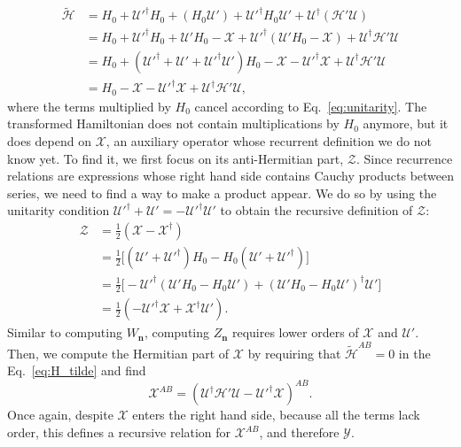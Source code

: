 \begin{equation}
\label{eq:H_tilde}
\begin{aligned}
  \tilde{\mathcal{H}}
  &= H_0 + \mathcal{U}'^\dagger H_0 + (H_0 \mathcal{U}') + \mathcal{U}'^\dagger H_0
  \mathcal{U}' + \mathcal{U}^\dagger(\mathcal{H'}\mathcal{U})
  \\
  &= H_0 + \mathcal{U}'^\dagger H_0 + \mathcal{U}'H_0 - \mathcal{X} + \mathcal{U}'^\dagger (\mathcal{U}' H_0 - \mathcal{X}) + \mathcal{U}^\dagger\mathcal{H'}\mathcal{U} \\
  &= H_0 + (\mathcal{U}'^\dagger + \mathcal{U}' + \mathcal{U}'^\dagger \mathcal{U}')H_0 - \mathcal{X} - \mathcal{U}'^\dagger \mathcal{X} + \mathcal{U}^\dagger\mathcal{H'}\mathcal{U} \\
  &= H_0 - \mathcal{X} - \mathcal{U}'^\dagger \mathcal{X} + \mathcal{U}^\dagger\mathcal{H'}\mathcal{U},
\end{aligned}
\end{equation}
%
where the terms multiplied by $H_0$ cancel according to Eq.~\eqref{eq:unitarity}.
The transformed Hamiltonian does not contain multiplications by $H_0$ anymore, but it
does depend on $\mathcal{X}$, an auxiliary operator whose recurrent definition
we do not know yet.
To find it, we first focus on its anti-Hermitian part, $\mathcal{Z}$.
Since recurrence relations are expressions whose right hand side contains
Cauchy products between series, we need to find a way to make a product appear.
We do so by using the unitarity condition $\mathcal{U}'^\dagger + \mathcal{U}' =
-\mathcal{U}'^\dagger \mathcal{U}'$ to obtain the recursive definition of $\mathcal{Z}$:
%
\begin{equation}
\label{eq:Z}
\begin{aligned}
\mathcal{Z}
&= \frac{1}{2} (\mathcal{X} - \mathcal{X}^{\dagger}) \\
&= \frac{1}{2}\Big[ (\mathcal{U}' + \mathcal{U}'^{\dagger}) H_0 - H_0 (\mathcal{U}' + \mathcal{U}'^{\dagger}) \Big] \\
&= \frac{1}{2} \Big[ - \mathcal{U}'^{\dagger} (\mathcal{U}'H_0 - H_0 \mathcal{U}') + (\mathcal{U}'H_0 - H_0 \mathcal{U}')^{\dagger} \mathcal{U}' \Big] \\
&= \frac{1}{2} (-\mathcal{U}'^{\dagger} \mathcal{X} + \mathcal{X}^{\dagger} \mathcal{U}').
\end{aligned}
\end{equation}
%
Similar to computing $W_{\mathbf{n}}$, computing $Z_{\mathbf{n}}$ requires lower orders of
$\mathcal{X}$ and $\mathcal{U}'$.
Then, we compute the Hermitian part of $\mathcal{X}$ by requiring that
$\tilde{\mathcal{H}}^{AB} = 0$ in the Eq.~\eqref{eq:H_tilde} and find
%
\begin{equation}
\label{eq:Y}
\mathcal{X}^{AB} = (\mathcal{U}^\dagger \mathcal{H}' \mathcal{U} -
\mathcal{U}'^\dagger \mathcal{X})^{AB}.
\end{equation}
%
Once again, despite $\mathcal{X}$ enters the right hand side, because all the
terms lack  order, this defines a recursive relation for $\mathcal{X}^{AB}$,
and therefore $\mathcal{Y}$.

